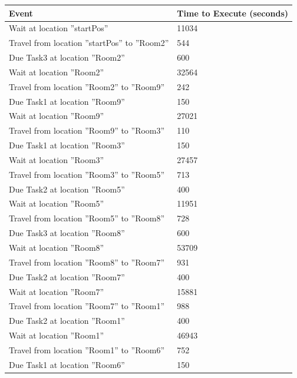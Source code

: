 \documentclass[11pt]{article}
\begin{document}
\begin{center}
    \begin{tabular}{ | p{7.5cm} | p{4.5cm} |}
    \hline
    Event & Time to Execute (seconds) \\ \hline \hline
    Wait at location ''startPos'' & 11034 \\ \hline
    Travel from location ''startPos'' to ''Room2'' & 544 \\ \hline
    Due Task3 at location ''Room2'' & 600 \\ \hline
    
    Wait at location ''Room2'' & 32564 \\ \hline
    Travel from location ''Room2'' to ''Room9'' & 242 \\ \hline
    Due Task1 at location ''Room9'' & 150 \\ \hline
    
    Wait at location ''Room9'' & 27021 \\ \hline
    Travel from location ''Room9'' to ''Room3'' & 110 \\ \hline
    Due Task1 at location ''Room3'' & 150 \\ \hline
    
    Wait at location ''Room3'' & 27457 \\ \hline
    Travel from location ''Room3'' to ''Room5'' & 713 \\ \hline
    Due Task2 at location ''Room5'' & 400 \\ \hline
    
    Wait at location ''Room5'' & 11951 \\ \hline
    Travel from location ''Room5'' to ''Room8'' & 728 \\ \hline
    Due Task3 at location ''Room8'' & 600 \\ \hline
    
    Wait at location ''Room8'' & 53709 \\ \hline
    Travel from location ''Room8'' to ''Room7'' & 931 \\ \hline
    Due Task2 at location ''Room7'' & 400 \\ \hline
    
    Wait at location ''Room7'' & 15881 \\ \hline
    Travel from location ''Room7'' to ''Room1'' & 988 \\ \hline
    Due Task2 at location ''Room1'' & 400 \\ \hline
    
    Wait at location ''Room1'' & 46943 \\ \hline
    Travel from location ''Room1'' to ''Room6'' & 752 \\ \hline
    Due Task1 at location ''Room6'' & 150 \\ \hline
    

\end{tabular}
\end{center}
\end{document}
